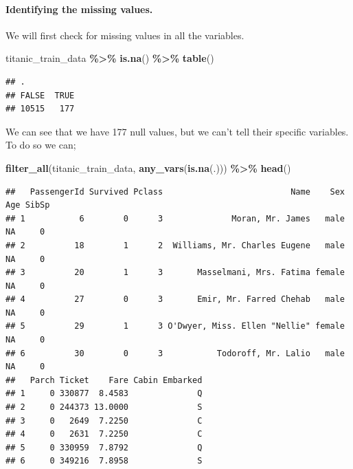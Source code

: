 \documentclass[
]{article}
\newenvironment{Shaded}{\begin{snugshade}}{\end{snugshade}}
\newcommand{\FunctionTok}[1]{\textcolor[rgb]{0.13,0.29,0.53}{\textbf{#1}}}
\newcommand{\NormalTok}[1]{#1}
\newcommand{\SpecialCharTok}[1]{\textcolor[rgb]{0.81,0.36,0.00}{\textbf{#1}}}
\begin{document}
\hypertarget{identifying-the-missing-values.}{%
\paragraph{Identifying the missing
values.}\label{identifying-the-missing-values.}}

We will first check for missing values in all the variables.

\begin{Shaded}
\begin{Highlighting}[]
\NormalTok{titanic\_train\_data }\SpecialCharTok{\%\textgreater{}\%}
  \FunctionTok{is.na}\NormalTok{() }\SpecialCharTok{\%\textgreater{}\%}
  \FunctionTok{table}\NormalTok{()}
\end{Highlighting}
\end{Shaded}

\begin{verbatim}
## .
## FALSE  TRUE 
## 10515   177
\end{verbatim}

We can see that we have 177 null values, but we can't tell their
specific variables. To do so we can;

\begin{Shaded}
\begin{Highlighting}[]
\FunctionTok{filter\_all}\NormalTok{(titanic\_train\_data, }\FunctionTok{any\_vars}\NormalTok{(}\FunctionTok{is.na}\NormalTok{(.))) }\SpecialCharTok{\%\textgreater{}\%}
  \FunctionTok{head}\NormalTok{()}
\end{Highlighting}
\end{Shaded}

\begin{verbatim}
##   PassengerId Survived Pclass                          Name    Sex Age SibSp
## 1           6        0      3              Moran, Mr. James   male  NA     0
## 2          18        1      2  Williams, Mr. Charles Eugene   male  NA     0
## 3          20        1      3       Masselmani, Mrs. Fatima female  NA     0
## 4          27        0      3       Emir, Mr. Farred Chehab   male  NA     0
## 5          29        1      3 O'Dwyer, Miss. Ellen "Nellie" female  NA     0
## 6          30        0      3           Todoroff, Mr. Lalio   male  NA     0
##   Parch Ticket    Fare Cabin Embarked
## 1     0 330877  8.4583              Q
## 2     0 244373 13.0000              S
## 3     0   2649  7.2250              C
## 4     0   2631  7.2250              C
## 5     0 330959  7.8792              Q
## 6     0 349216  7.8958              S
\end{verbatim}
\end{document}

